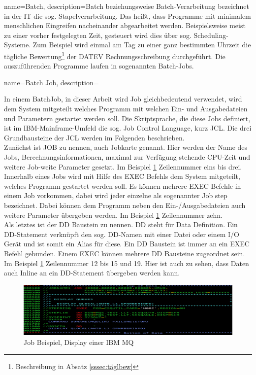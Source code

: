 \makeglossaries

{
	name=Batch,
	description={Batch beziehungsweise Batch-Verarbeitung bezeichnet in der IT die sog. \glqq Stapelverarbeitung\grqq.
Das heißt, dass Programme mit minimalem menschlichen Eingreifen nacheinander abgearbeitet werden.
Beispielsweise meist zu einer vorher festgelegten Zeit, gesteuert wird dies über sog. \glqq Scheduling\grqq-Systeme.
Zum Beispiel wird einmal am Tag zu einer ganz bestimmten Uhrzeit die tägliche Bewertung\footnote{Beschreibung in Absatz \ref{sssec:täglbew}} der DATEV Rechnungsschreibung durchgeführt.
Die auszuführenden Programme laufen in sogenannten \glqq Batch-Jobs\grqq.
\cite[S. 274]{Ebbers.2011}}
}

{
	name=Batch Job,
	description={In einem Batch\-Job, in dieser Arbeit wird \glqq Job\grqq{} gleichbedeutend verwendet, wird dem System mitgeteilt welches Programm mit welchen Ein- und Ausgabedateien und Parametern gestartet werden soll.
Die Skriptsprache, die diese Jobs definiert, ist im IBM-Mainframe-Umfeld die sog. \glqq Job Control Language\grqq, kurz JCL.
Die drei Grundbausteine der JCL werden im Folgenden beschrieben.\\
Zunächst ist \glqq JOB\grqq{} zu nennen, auch Jobkarte genannt.
Hier werden der Name des Jobs, Berechnungsinformationen, maximal zur Verfügung stehende CPU-Zeit und weitere Job-weite Parameter gesetzt.
Im Beispiel \ref{fig:jclBsp} Zeilennummer eins bis drei.\\
Innerhalb eines Jobs wird mit Hilfe des \glqq EXEC\grqq{} Befehls dem System mitgeteilt, welches Programm gestartet werden soll.
Es können mehrere \glqq EXEC\grqq{}  Befehle in einem Job vorkommen, dabei wird jeder einzelne als sogenannter \glqq Job step\grqq{} bezeichnet.
Dabei können dem Programm neben den Ein-/Ausgabedateien auch weitere Parameter übergeben werden.
Im Beispiel \ref{fig:jclBsp} Zeilennummer zehn.\\
Als letztes ist der \glqq DD\grqq{} Baustein zu nennen.
\glqq DD\grqq{} steht für Data Definition.
Ein DD-Statement verknüpft den sog. DD-Namen mit einer Datei oder einem I/O Gerät und ist somit ein Alias für diese.
Ein \glqq DD\grqq{} Baustein ist immer an ein \glqq EXEC\grqq{} Befehl gebunden.
Einem \glqq EXEC\grqq{} können mehrere \glqq DD\grqq{} Bausteine zugeordnet sein. 
Im Beispiel \ref{fig:jclBsp} Zeilennummer 12 bis 15 und 19.
Hier ist auch zu sehen, dass Daten auch Inline an ein DD-Statement übergeben werden kann.
\cite[S. 274]{Ebbers.2011}
\begin{figure}[h]
\centering
\includegraphics[width=\textwidth]{figures/dispq.PNG}
\caption{Job Beispiel, Display einer IBM MQ}
\label{fig:jclBsp}
\end{figure}}
}

